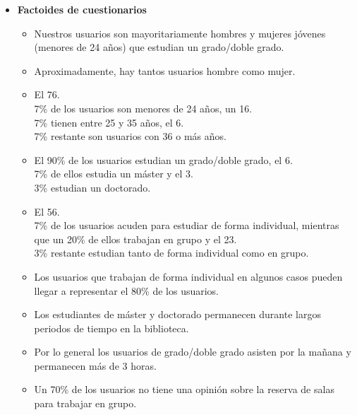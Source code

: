\documentclass[12pt]{article}
\begin{document}
\begin{itemize}
\item \textbf{Factoides de cuestionarios}
\begin{itemize}
\item Nuestros usuarios son mayoritariamente hombres y mujeres jóvenes (menores de 24 años) que estudian un grado/doble grado.\\

\item Aproximadamente, hay tantos usuarios hombre como mujer.\\

\item El 76.\\7\% de los usuarios son menores de 24 años, un 16.\\7\% tienen entre 25 y 35 años, el 6.\\7\% restante son usuarios con 36 o más años.\\

\item El 90\% de los usuarios estudian un grado/doble grado, el 6.\\7\% de ellos estudia un máster y el 3.\\3\% estudian un doctorado.\\

\item El 56.\\7\% de los usuarios acuden para estudiar de forma individual, mientras que un 20\% de ellos trabajan en grupo y el 23.\\3\% restante estudian tanto de forma individual como en grupo.\\

\item Los usuarios que trabajan de forma individual en algunos casos pueden llegar a representar el 80\% de los usuarios.\\

\item Los estudiantes de máster y doctorado permanecen durante largos periodos de tiempo en la biblioteca.\\

\item Por lo general los usuarios de grado/doble grado asisten por la mañana y permanecen más de 3 horas.\\

\item Un 70\% de los usuarios no tiene una opinión sobre la reserva de salas para trabajar en grupo.\\


\end{itemize}
\end{itemize}
\end{document}

